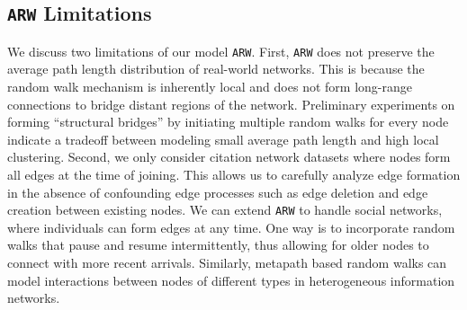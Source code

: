 \subsection{\texttt{ARW} Limitations}
We discuss two limitations of our model \texttt{ARW}. First, \texttt{ARW} does not preserve the average
path length distribution of real-world networks. This is because the random walk
mechanism is inherently local and does not form {long-range connections} to bridge
distant regions of the network. Preliminary experiments on forming ``structural bridges''
by initiating multiple random walks for every node indicate a tradeoff
between modeling small average path length and high local clustering. Second,
we only consider citation network datasets where nodes form all edges at the time of joining.
This allows us to carefully analyze edge formation in the absence of confounding edge processes
such as edge deletion and edge creation between existing nodes. We can extend \texttt{ARW} to handle social networks, where individuals can form edges at any time. One way is to incorporate random walks that pause and resume intermittently, thus allowing for older nodes to connect with more recent arrivals.
Similarly, metapath based random walks can model interactions between
nodes of different types in heterogeneous information networks.













%

